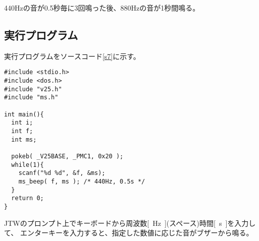 440Hzの音が0.5秒毎に3回鳴った後、880Hzの音が1秒間鳴る。

\subsection{実行プログラム}
実行プログラムをソースコード\ref{s7}に示す。
\begin{lstlisting}[caption=演習6のプログラム,label=s7]
#include <stdio.h>
#include <dos.h>
#include "v25.h"
#include "ms.h"
  
int main(){
  int i;
  int f;
  int ms;

  pokeb( _V25BASE, _PMC1, 0x20 );
  while(1){
    scanf("%d %d", &f, &ms);
    ms_beep( f, ms ); /* 440Hz, 0.5s */
  }
  return 0;
}
\end{lstlisting}

JTWのプロンプト上でキーボードから周波数\si{[Hz]}(スペース)時間\si{[s]}を入力して、
エンターキーを入力すると、指定した数値に応じた音がブザーから鳴る。